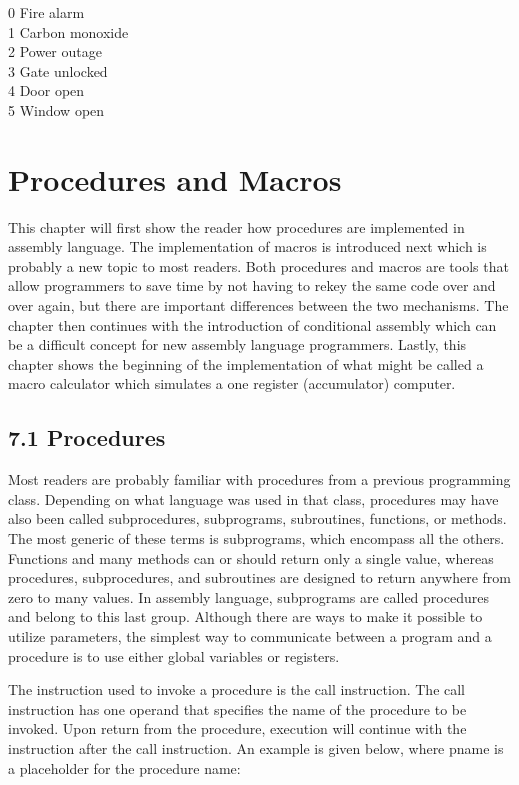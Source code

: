 \documentclass[10pt]{book}
\begin{document}
0 Fire alarm\\
1 Carbon monoxide\\
2 Power outage\\
3 Gate unlocked\\
4 Door open\\
5 Window open

\section*{Procedures and Macros}
This chapter will first show the reader how procedures are implemented in assembly language. The implementation of macros is introduced next which is probably a new topic to most readers. Both procedures and macros are tools that allow programmers to save time by not having to rekey the same code over and over again, but there are important differences between the two mechanisms. The chapter then continues with the introduction of conditional assembly which can be a difficult concept for new assembly language programmers. Lastly, this chapter shows the beginning of the implementation of what might be called a macro calculator which simulates a one register (accumulator) computer.

\subsection*{7.1 Procedures}
Most readers are probably familiar with procedures from a previous programming class. Depending on what language was used in that class, procedures may have also been called subprocedures, subprograms, subroutines, functions, or methods. The most generic of these terms is subprograms, which encompass all the others. Functions and many methods can or should return only a single value, whereas procedures, subprocedures, and subroutines are designed to return anywhere from zero to many values. In assembly language, subprograms are called procedures and belong to this last group. Although there are ways to make it possible to utilize parameters, the simplest way to communicate between a program and a procedure is to use either global variables or registers.

The instruction used to invoke a procedure is the call instruction. The call instruction has one operand that specifies the name of the procedure to be invoked. Upon return from the procedure, execution will continue with the instruction after the call instruction. An example is given below, where pname is a placeholder for the procedure name:
\end{document}
